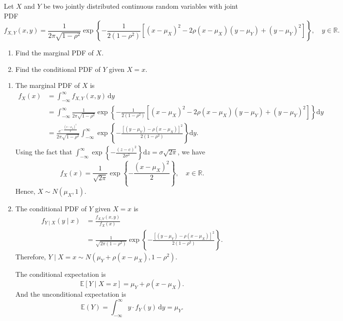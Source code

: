 \begin{example}
    Let $X$ and $Y$ be two jointly distributed continuous random variables with joint PDF
    \[
        f_{X,Y}(x,y) = \frac{1}{2\pi\sqrt{1-\rho^2}} \exp\left\{ -\frac{1}{2(1-\rho^2)} \left[ (x - \mu_X)^2 - 2\rho(x-\mu_X)(y-\mu_Y) + (y-\mu_Y)^2 \right] \right\}, \quad y \in \mathbb{R}.
    \]
    \begin{enumerate}
        \item Find the marginal PDF of $X$.
        \item Find the conditional PDF of $Y$ given $X = x$.
    \end{enumerate}
\end{example}
\begin{solution}
    \begin{enumerate}
        \item The marginal PDF of $X$ is
        \begin{align*}
            f_X(x) &= \int_{-\infty}^{\infty} f_{X,Y}(x,y) \, \mathrm{d}y \\
            &= \int_{-\infty}^{\infty} \frac{1}{2\pi\sqrt{1-\rho^2}} \exp\left\{ -\frac{1}{2(1-\rho^2)} \left[ (x-\mu_X)^2 - 2\rho(x-\mu_X)(y-\mu_Y) + (y-\mu_Y)^2 \right] \right\} \mathrm{d}y \\
            &= \frac{e^{-\frac{(x-\mu_X)^2}{2}}}{2\pi\sqrt{1-\rho^2}} \int_{-\infty}^{\infty} \exp\left\{ -\frac{\left[ (y-\mu_Y) - \rho(x-\mu_X) \right]^2}{2(1-\rho^2)} \right\} \mathrm{d}y.
        \end{align*}
        Using the fact that $\displaystyle\int_{-\infty}^{\infty} \exp\left\{ -\frac{(z-c)^2}{2\sigma^2} \right\} \mathrm{d}z = \sigma\sqrt{2\pi}$, we have
        \[
            f_X(x) = \frac{1}{\sqrt{2\pi}} \exp\left\{ -\frac{(x-\mu_X)^2}{2} \right\}, \quad x \in \mathbb{R}.
        \]
        Hence, $X \sim N(\mu_X, 1)$.

        \item The conditional PDF of $Y$ given $X = x$ is
        \begin{align*}
            f_{Y \mid X}(y \mid x) &= \frac{f_{X,Y}(x,y)}{f_X(x)} \\
            &= \frac{1}{\sqrt{2\pi(1-\rho^2)}} \exp\left\{ -\frac{\left[ (y - \mu_Y) - \rho(x - \mu_X) \right]^2}{2(1-\rho^2)} \right\}.
        \end{align*}
        Therefore, $Y \mid X = x \sim N\left( \mu_Y + \rho(x - \mu_X), 1 - \rho^2 \right)$.

        The conditional expectation is
        \[
            \mathbb{E}[Y \mid X = x] = \mu_Y + \rho(x - \mu_X).
        \]
        And the unconditional expectation is
        \[
            \mathbb{E}(Y) = \int_{-\infty}^{\infty} y \cdot f_Y(y) \, \mathrm{d}y = \mu_Y.
        \]
    \end{enumerate}
\end{solution}

